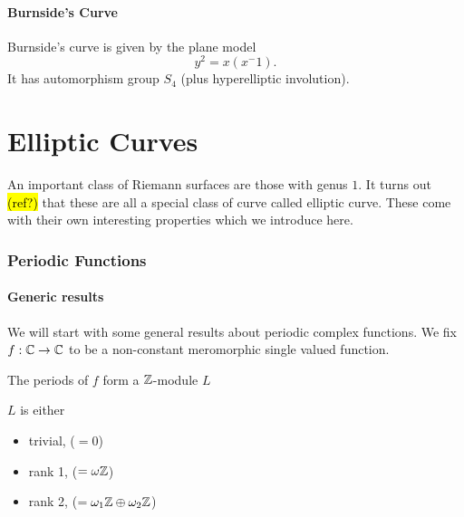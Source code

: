 \documentclass{article}
\begin{document}
\subsection{Burnside's Curve}
Burnside's curve is given by the plane model 
\[
y^2 = x(x^-1) .
\]
It has automorphism group $S_4$ (plus hyperelliptic involution). 
\part{Elliptic Curves}
An important class of Riemann surfaces are those with genus $1$. It turns out \hl{(ref?)} that these are all a special class of curve called elliptic curve. These come with their own interesting properties which we introduce here. 


\section{Periodic Functions}

\subsection{Generic results}

We will start with some general results about periodic complex functions. We fix $f:\mathbb{C} \to \mathbb{C}$ to be a non-constant meromorphic single valued function. 

\begin{lemma}
	The periods of $f$ form a $\mathbb{Z}$-module $L$ 
\end{lemma}

\begin{prop}
	$L$ is either 
	\begin{itemize}
		\item trivial, ($=0$)
		\item rank 1, ($=\omega \mathbb{Z}$)
		\item rank 2, ($=\omega_1 \mathbb{Z} \oplus \omega_2 \mathbb{Z}$)
	\end{itemize}
\end{prop}
\end{document}

